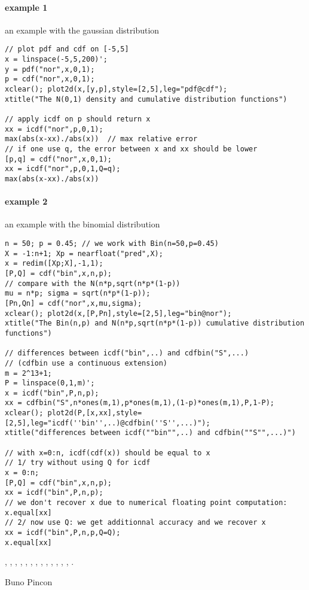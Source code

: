 \begin{examples}
  
\paragraph{example 1} an example with the gaussian distribution
\begin{Verbatim}
// plot pdf and cdf on [-5,5]
x = linspace(-5,5,200)';
y = pdf("nor",x,0,1);
p = cdf("nor",x,0,1);
xclear(); plot2d(x,[y,p],style=[2,5],leg="pdf@cdf");
xtitle("The N(0,1) density and cumulative distribution functions")

// apply icdf on p should return x
xx = icdf("nor",p,0,1);
max(abs(x-xx)./abs(x))  // max relative error
// if one use q, the error between x and xx should be lower
[p,q] = cdf("nor",x,0,1);
xx = icdf("nor",p,0,1,Q=q);
max(abs(x-xx)./abs(x))
\end{Verbatim}
  
\paragraph{example 2} an example with the binomial distribution
\begin{Verbatim}
n = 50; p = 0.45; // we work with Bin(n=50,p=0.45)
X = -1:n+1; Xp = nearfloat("pred",X);
x = redim([Xp;X],-1,1);
[P,Q] = cdf("bin",x,n,p);
// compare with the N(n*p,sqrt(n*p*(1-p))
mu = n*p; sigma = sqrt(n*p*(1-p));
[Pn,Qn] = cdf("nor",x,mu,sigma);
xclear(); plot2d(x,[P,Pn],style=[2,5],leg="bin@nor");
xtitle("The Bin(n,p) and N(n*p,sqrt(n*p*(1-p)) cumulative distribution functions")

// differences between icdf("bin",..) and cdfbin("S",...)
// (cdfbin use a continuous extension) 
m = 2^13+1;
P = linspace(0,1,m)';
x = icdf("bin",P,n,p);
xx = cdfbin("S",n*ones(m,1),p*ones(m,1),(1-p)*ones(m,1),P,1-P);
xclear(); plot2d(P,[x,xx],style=[2,5],leg="icdf(''bin'',..)@cdfbin(''S'',...)");
xtitle("differences between icdf(""bin"",..) and cdfbin(""S"",...)")

// with x=0:n, icdf(cdf(x)) should be equal to x
// 1/ try without using Q for icdf
x = 0:n;
[P,Q] = cdf("bin",x,n,p);
xx = icdf("bin",P,n,p);
// we don't recover x due to numerical floating point computation:
x.equal[xx]
// 2/ now use Q: we get additionnal accuracy and we recover x
xx = icdf("bin",P,n,p,Q=Q);
x.equal[xx]
\end{Verbatim}
 
\end{examples}

\begin{manseealso}
  , , , , ,
  , , , , 
  , , , , .
\end{manseealso}


\begin{authors}
  Buno Pincon
\end{authors}

